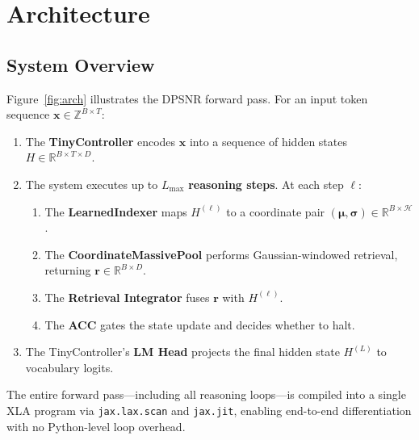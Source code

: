 \documentclass[11pt]{article}
\begin{document}
\section{Architecture}
\label{sec:arch}

\subsection{System Overview}
\label{sec:overview}

Figure~\ref{fig:arch} illustrates the DPSNR forward pass.
For an input token sequence $\mathbf{x} \in \mathbb{Z}^{B \times T}$:

\begin{enumerate}[leftmargin=1.8em]
  \item The \textbf{TinyController} encodes $\mathbf{x}$ into a sequence of
        hidden states $H \in \mathbb{R}^{B \times T \times D}$.
  \item The system executes up to $L_{\max}$ \textbf{reasoning steps}.
        At each step $\ell$:
    \begin{enumerate}[label=\alph*.]
      \item The \textbf{LearnedIndexer} maps $H^{(\ell)}$ to a coordinate
            pair $(\boldsymbol{\mu}, \boldsymbol{\sigma}) \in \mathbb{R}^{B
            \times \mathcal{H}}$.
      \item The \textbf{CoordinateMassivePool} performs Gaussian-windowed
            retrieval, returning $\mathbf{r} \in \mathbb{R}^{B \times D}$.
      \item The \textbf{Retrieval Integrator} fuses $\mathbf{r}$ with
            $H^{(\ell)}$.
      \item The \textbf{ACC} gates the state update and decides whether to
            halt.
    \end{enumerate}
  \item The TinyController's \textbf{LM Head} projects the final hidden state
        $H^{(L)}$ to vocabulary logits.
\end{enumerate}

The entire forward pass—including all reasoning loops—is compiled into a single
XLA program via \texttt{jax.lax.scan} and \texttt{jax.jit}, enabling
end-to-end differentiation with no Python-level loop overhead.
\end{document}
